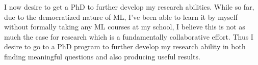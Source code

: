 \documentclass[12pt]{article}
\begin{document}
I now desire to get a PhD to further develop my research abilities. While so far, due to the democratized nature of ML, I've been able to learn it by myself without formally taking any ML courses at my school, I believe this is not as much the case for
research which is a fundamentally collaborative effort. Thus I desire to go to a PhD program to further develop my research ability in both finding meaningful questions and also producing useful results.








\end{document}
